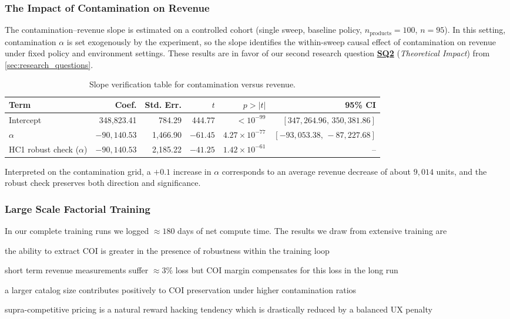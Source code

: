 \subsubsection{The Impact of Contamination on Revenue}

The contamination--revenue slope is estimated on a controlled cohort (single sweep, baseline policy, $n_{\text{products}}=100$, $n=95$). In this setting, contamination $\alpha$ is set exogenously by the experiment, so the slope identifies the within-sweep causal effect of contamination on revenue under fixed policy and environment settings. These results are in favor of our second research question \hyperlink{sq2}{\textbf{SQ2}} (\textit{Theoretical Impact}) from \cref{sec:research_questions}.

\begin{table}[ht]
\centering
\caption{Slope verification table for contamination versus revenue.}
\label{tab:contamination_slope_table}
\begin{tabular}{@{}lrrrrr@{}}
\toprule
Term & Coef. & Std. Err. & $t$ & $p>|t|$ & 95\% CI \\
\midrule
Intercept & 348,823.41 & 784.29 & 444.77 & $<10^{-99}$ & $[347,264.96,\,350,381.86]$ \\
$\alpha$ & $-90,140.53$ & 1,466.90 & $-61.45$ & $4.27\times10^{-77}$ & $[-93,053.38,\,-87,227.68]$ \\
\midrule
HC1 robust check ($\alpha$) & $-90,140.53$ & 2,185.22 & $-41.25$ & $1.42\times10^{-61}$ & -- \\
\bottomrule
\end{tabular}
\end{table}

Interpreted on the contamination grid, a $+0.1$ increase in $\alpha$ corresponds to an average revenue decrease of about $9{,}014$ units, and the robust check preserves both direction and significance.

\subsubsection{Large Scale Factorial Training}

In our complete training runs we logged $\approx 180$ days of net compute time. The results we draw from extensive training are
\begin{enumerate*}[label=(\roman*)]
  \item the ability to extract COI is greater in the presence of robustness within the training loop
  \item short term revenue measurements suffer $\approx 3\%$ loss but COI margin compensates for this loss in the long run
  \item a larger catalog size contributes positively to COI preservation under higher contamination ratios
  \item supra-competitive pricing is a natural reward hacking tendency which is drastically reduced by a balanced UX penalty
\end{enumerate*}

